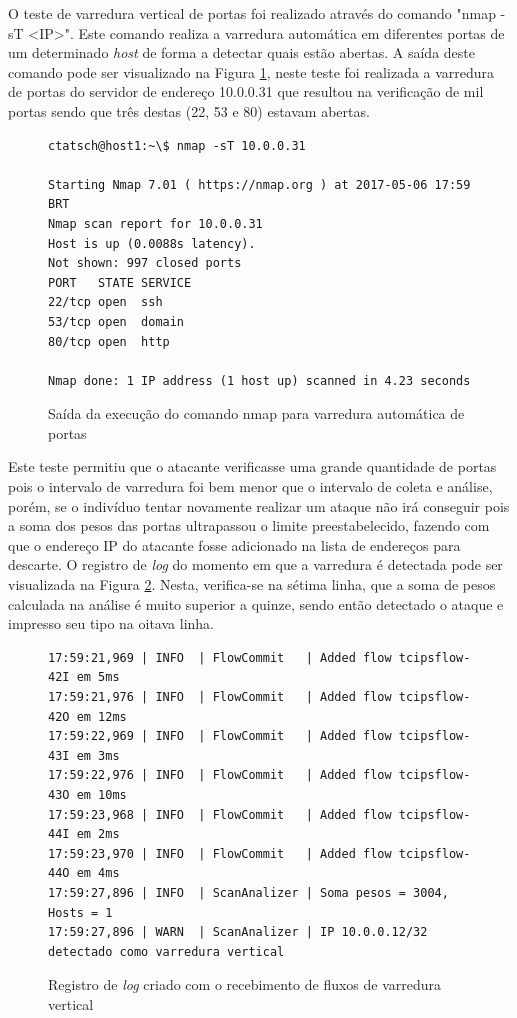 O teste de varredura vertical de portas foi realizado através do comando "nmap -sT <IP>". Este comando realiza a varredura automática em diferentes portas de um determinado \textit{host} de forma a detectar quais estão abertas. A saída deste comando pode ser visualizado na Figura \ref{fig:outnmapst}, neste teste foi realizada a varredura de portas do servidor de endereço 10.0.0.31 que resultou na verificação de mil portas sendo que três destas (22, 53 e 80) estavam abertas.
\FloatBarrier
\begin{figure}[H]
\centering
\caption{Saída da execução do comando nmap para varredura automática de portas}
\begin{lstlisting}[belowskip=-0.05\baselineskip]
ctatsch@host1:~\$ nmap -sT 10.0.0.31

Starting Nmap 7.01 ( https://nmap.org ) at 2017-05-06 17:59 BRT
Nmap scan report for 10.0.0.31
Host is up (0.0088s latency).
Not shown: 997 closed ports
PORT   STATE SERVICE
22/tcp open  ssh
53/tcp open  domain
80/tcp open  http

Nmap done: 1 IP address (1 host up) scanned in 4.23 seconds
\end{lstlisting}
\label{fig:outnmapst}
\end{figure}

Este teste permitiu que o atacante verificasse uma grande quantidade de portas pois o intervalo de varredura foi bem menor que o intervalo de coleta e análise, porém, se o indivíduo tentar novamente realizar um ataque não irá conseguir pois a soma dos pesos das portas ultrapassou o limite preestabelecido, fazendo com que o endereço IP do atacante fosse adicionado na lista de endereços para descarte. O registro de \textit{log} do momento em que a varredura é detectada pode ser visualizada na Figura \ref{fig:logver}. Nesta, verifica-se na sétima linha, que a soma de pesos calculada na análise é muito superior a quinze, sendo então detectado o ataque e impresso seu tipo na oitava linha.

\FloatBarrier
\begin{figure}[H]
\centering
\caption{Registro de \textit{log} criado com o recebimento de fluxos de varredura vertical}
\begin{lstlisting}[belowskip=-0.05\baselineskip]
17:59:21,969 | INFO  | FlowCommit   | Added flow tcipsflow-42I em 5ms
17:59:21,976 | INFO  | FlowCommit   | Added flow tcipsflow-42O em 12ms
17:59:22,969 | INFO  | FlowCommit   | Added flow tcipsflow-43I em 3ms
17:59:22,976 | INFO  | FlowCommit   | Added flow tcipsflow-43O em 10ms
17:59:23,968 | INFO  | FlowCommit   | Added flow tcipsflow-44I em 2ms
17:59:23,970 | INFO  | FlowCommit   | Added flow tcipsflow-44O em 4ms
17:59:27,896 | INFO  | ScanAnalizer | Soma pesos = 3004, Hosts = 1
17:59:27,896 | WARN  | ScanAnalizer | IP 10.0.0.12/32 detectado como varredura vertical
\end{lstlisting}
\label{fig:logver}
\end{figure}

